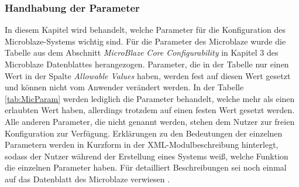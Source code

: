 \subsubsection{Handhabung der Parameter}
In diesem Kapitel wird behandelt, welche Parameter für die Konfiguration des Microblaze-Systems wichtig sind.
Für die Parameter des Microblaze wurde die Tabelle aus dem Abschnitt \textit{MicroBlaze Core Configurability} in Kapitel 3 des Microblaze Datenblattes \cite{MBREF} herangezogen. Parameter, die in der Tabelle nur einen Wert in der Spalte \textit{Allowable Values} haben, werden fest auf diesen Wert gesetzt und können nicht vom Anwender verändert werden. In der Tabelle \ref{tab:MicParam} werden lediglich die Parameter behandelt, welche mehr als einen erlaubten Wert haben, allerdings trotzdem auf einen festen Wert gesetzt werden. Alle anderen Parameter, die nicht genannt werden, stehen dem Nutzer zur freien Konfiguration zur Verfügung. Erklärungen zu den Bedeutungen der einzelnen Parametern werden in Kurzform in der XML-Modulbeschreibung hinterlegt, sodass der Nutzer während der Erstellung eines Systems weiß, welche Funktion die einzelnen Parameter haben. Für detailliert Beschreibungen sei noch einmal auf das Datenblatt des Microblaze verwiesen \cite{MBREF}.
